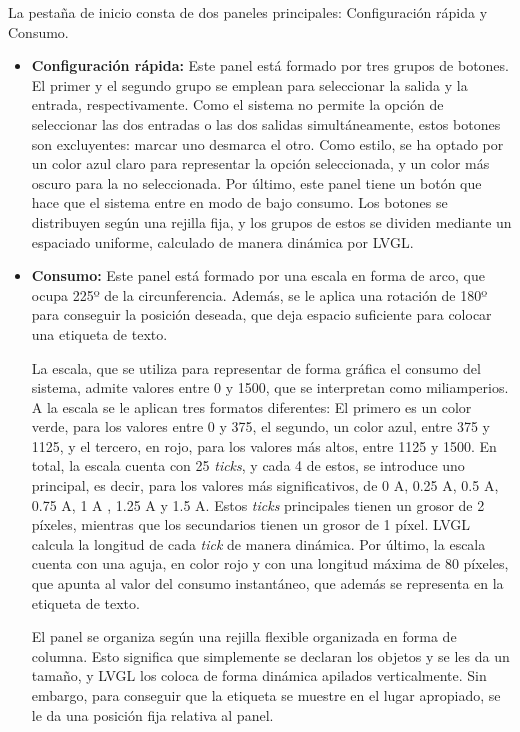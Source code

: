 La pestaña de inicio consta de dos paneles principales: Configuración rápida y Consumo.
\begin{itemize}
    \item \textbf{Configuración rápida:} Este panel está formado por tres grupos de botones. El primer y el segundo grupo se emplean para seleccionar la salida y la entrada, respectivamente. Como el sistema no permite la opción de seleccionar las dos entradas o las dos salidas simultáneamente, estos botones son excluyentes: marcar uno desmarca el otro. Como estilo, se ha optado por un color azul claro para representar la opción seleccionada, y un color más oscuro para la no seleccionada. Por último, este panel tiene un botón que hace que el sistema entre en modo de bajo consumo. Los botones se distribuyen según una rejilla fija, y los grupos de estos se dividen mediante un espaciado uniforme, calculado de manera dinámica por LVGL.
    \item \textbf{Consumo:} Este panel está formado por una escala en forma de arco, que ocupa 225º de la circunferencia. Además, se le aplica una rotación de 180º para conseguir la posición deseada, que deja espacio suficiente para colocar una etiqueta de texto. 
    
    La escala, que se utiliza para representar de forma gráfica el consumo del sistema, admite valores entre 0 y 1500, que se interpretan como miliamperios. A la escala se le aplican tres formatos diferentes: El primero es un color verde, para los valores entre 0 y 375, el segundo, un color azul, entre 375 y 1125, y el tercero, en rojo, para los valores más altos, entre 1125 y 1500. En total, la escala cuenta con 25 \textit{ticks}, y cada 4 de estos, se introduce uno principal, es decir, para los valores más significativos, de 0 A, 0.25 A, 0.5 A, 0.75 A, 1 A , 1.25 A y 1.5 A. Estos \textit{ticks} principales tienen un grosor de 2 píxeles, mientras que los secundarios tienen un grosor de 1 píxel. LVGL calcula la longitud de cada \textit{tick} de manera dinámica. Por último, la escala cuenta con una aguja, en color rojo y con una longitud máxima de 80 píxeles, que apunta al valor del consumo instantáneo, que además se representa en la etiqueta de texto.

    El panel se organiza según una rejilla flexible organizada en forma de columna. Esto significa que simplemente se declaran los objetos y se les da un tamaño, y LVGL los coloca de forma dinámica apilados verticalmente. Sin embargo, para conseguir que la etiqueta se muestre en el lugar apropiado, se le da una posición fija relativa al panel.
\end{itemize}

